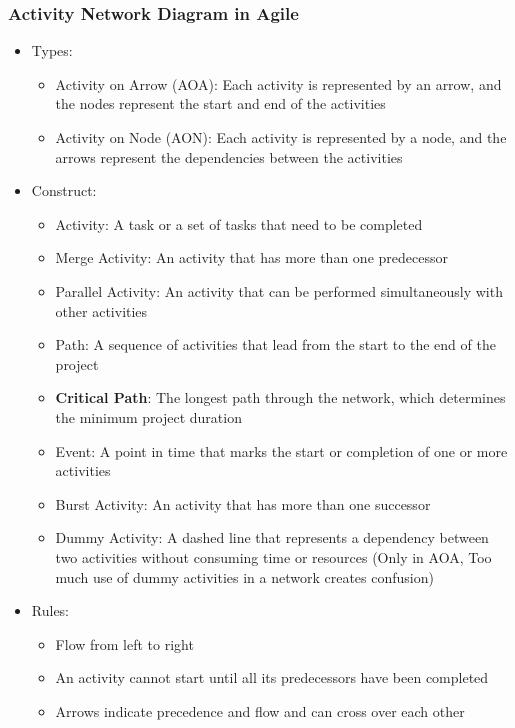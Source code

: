 \documentclass[12pt,openany]{book}
\begin{document}
\subsubsection{Activity Network Diagram in Agile}
\begin{itemize}
    \item Types:
    \begin{itemize}
        \item Activity on Arrow (AOA): Each activity is represented by an arrow, and the nodes represent the start and end of the activities
        \item Activity on Node (AON): Each activity is represented by a node, and the arrows represent the dependencies between the activities
    \end{itemize}
    \item Construct:
    \begin{itemize}
        \item Activity: A task or a set of tasks that need to be completed
        \item Merge Activity: An activity that has more than one predecessor
        \item Parallel Activity: An activity that can be performed simultaneously with other activities
        \item Path: A sequence of activities that lead from the start to the end of the project
        \item \textbf{Critical Path}: The longest path through the network, which determines the minimum project duration
        \item Event: A point in time that marks the start or completion of one or more activities
        \item Burst Activity: An activity that has more than one successor
        \item Dummy Activity: A dashed line that represents a dependency between two activities without consuming time or resources (Only in AOA, Too much use of dummy activities in a network creates confusion)
    \end{itemize}
    \item Rules:
    \begin{itemize}
        \item Flow from left to right
        \item An activity cannot start until all its predecessors have been completed
        \item Arrows indicate precedence and flow and can cross over each other

\end{itemize}
\end{itemize}
\end{document}
